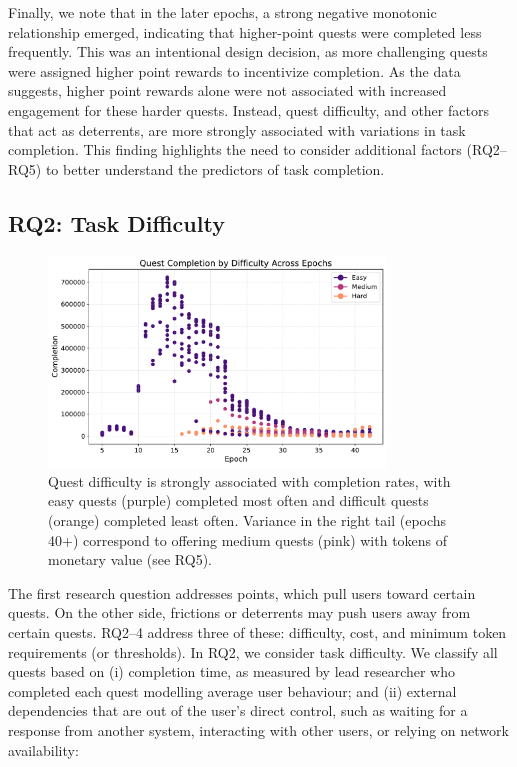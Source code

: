 Finally, we note that in the later epochs, a strong negative monotonic relationship emerged, indicating that higher-point quests were completed less frequently. This was an intentional design decision, as more challenging quests were assigned higher point rewards to incentivize completion. As the data suggests, higher point rewards alone were not associated with increased engagement for these harder quests. Instead, quest difficulty, and other factors that act as deterrents, are more strongly associated with variations in task completion. This finding highlights the need to consider additional factors (RQ2–RQ5) to better understand the predictors of task completion.


\subsection{RQ2: Task Difficulty}

\begin{figure}[t]
    \centering
    \includegraphics[width=0.8\textwidth]{figures/difficulty.pdf}
    \caption{Quest difficulty is strongly associated with completion rates, with easy quests (purple) completed most often and difficult quests (orange) completed least often. Variance in the right tail (epochs 40+) correspond to offering medium quests (pink) with tokens of monetary value (see RQ5).\label{fig:difficulty}}
\end{figure}

The first research question addresses points, which pull users toward certain quests. On the other side, frictions or deterrents may push users away from certain quests. RQ2--4 address three of these: difficulty, cost, and minimum token requirements (or thresholds). In RQ2, we consider task difficulty. We classify all quests based on (i) completion time, as measured by lead researcher who completed each quest modelling average user behaviour; and (ii) external dependencies that are out of the user's direct control, such as waiting for a response from another system, interacting with other users, or relying on network availability:

